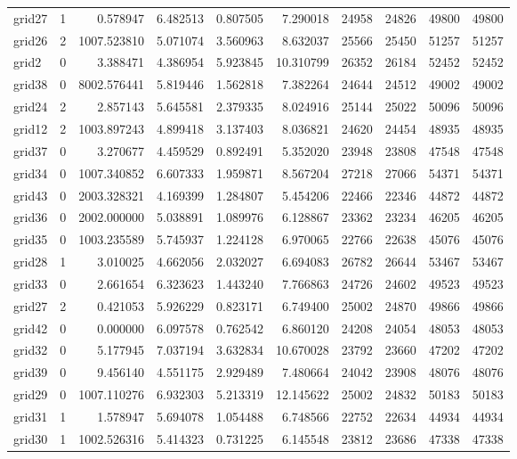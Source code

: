 \begin{longtable}{|l|r|r|r|r|r|r|r|r|r|}
grid27 & 1 & 0.578947 & 6.482513 & 0.807505 & 7.290018 & 24958 & 24826 & 49800 & 49800 \\
grid26 & 2 & 1007.523810 & 5.071074 & 3.560963 & 8.632037 & 25566 & 25450 & 51257 & 51257 \\
grid2 & 0 & 3.388471 & 4.386954 & 5.923845 & 10.310799 & 26352 & 26184 & 52452 & 52452 \\
grid38 & 0 & 8002.576441 & 5.819446 & 1.562818 & 7.382264 & 24644 & 24512 & 49002 & 49002 \\
grid24 & 2 & 2.857143 & 5.645581 & 2.379335 & 8.024916 & 25144 & 25022 & 50096 & 50096 \\
grid12 & 2 & 1003.897243 & 4.899418 & 3.137403 & 8.036821 & 24620 & 24454 & 48935 & 48935 \\
grid37 & 0 & 3.270677 & 4.459529 & 0.892491 & 5.352020 & 23948 & 23808 & 47548 & 47548 \\
grid34 & 0 & 1007.340852 & 6.607333 & 1.959871 & 8.567204 & 27218 & 27066 & 54371 & 54371 \\
grid43 & 0 & 2003.328321 & 4.169399 & 1.284807 & 5.454206 & 22466 & 22346 & 44872 & 44872 \\
grid36 & 0 & 2002.000000 & 5.038891 & 1.089976 & 6.128867 & 23362 & 23234 & 46205 & 46205 \\
grid35 & 0 & 1003.235589 & 5.745937 & 1.224128 & 6.970065 & 22766 & 22638 & 45076 & 45076 \\
grid28 & 1 & 3.010025 & 4.662056 & 2.032027 & 6.694083 & 26782 & 26644 & 53467 & 53467 \\
grid33 & 0 & 2.661654 & 6.323623 & 1.443240 & 7.766863 & 24726 & 24602 & 49523 & 49523 \\
grid27 & 2 & 0.421053 & 5.926229 & 0.823171 & 6.749400 & 25002 & 24870 & 49866 & 49866 \\
grid42 & 0 & 0.000000 & 6.097578 & 0.762542 & 6.860120 & 24208 & 24054 & 48053 & 48053 \\
grid32 & 0 & 5.177945 & 7.037194 & 3.632834 & 10.670028 & 23792 & 23660 & 47202 & 47202 \\
grid39 & 0 & 9.456140 & 4.551175 & 2.929489 & 7.480664 & 24042 & 23908 & 48076 & 48076 \\
grid29 & 0 & 1007.110276 & 6.932303 & 5.213319 & 12.145622 & 25002 & 24832 & 50183 & 50183 \\
grid31 & 1 & 1.578947 & 5.694078 & 1.054488 & 6.748566 & 22752 & 22634 & 44934 & 44934 \\
grid30 & 1 & 1002.526316 & 5.414323 & 0.731225 & 6.145548 & 23812 & 23686 & 47338 & 47338 \\

\end{longtable}
